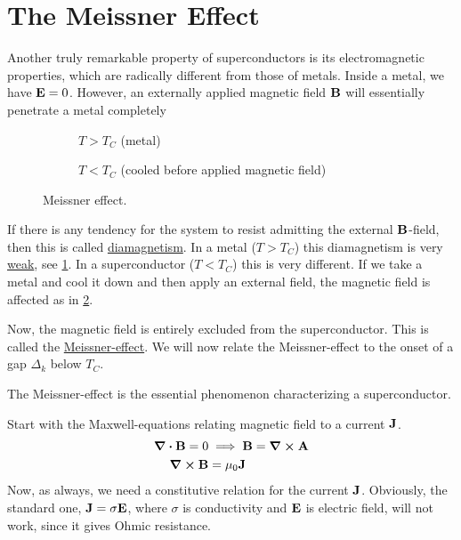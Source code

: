 \section{The Meissner Effect}
Another truly remarkable property of superconductors is its electromagnetic properties, which are radically different from those of metals.
Inside a metal, we have $\vb E = 0$. However, an externally applied magnetic field $\vb B$ will essentially penetrate a metal completely

\begin{figure}
	\centering
	\begin{subfigure}{0.45\textwidth}
		\centering
		
		\caption{$T>T_C$ (metal)}
		\label{fig:meissn_a}
	\end{subfigure}
	\begin{subfigure}{0.45\textwidth}
		\centering
		
		\caption{$T<T_C$ (cooled before applied magnetic field)}
		\label{fig:meissn_b}
	\end{subfigure}	
	\caption{Meissner effect.}
	\label{fig:meissner_1}
\end{figure}
If there is any tendency for the system to resist admitting the external $\vb B$-field, then this is called \underline{diamagnetism}. In a metal ($T>T_C$) this diamagnetism is very \underline{weak}, see \cref{fig:meissn_a}. In a superconductor ($T<T_C$) this is very different. If we take a metal and cool it down and then apply an external field, the magnetic field is affected as in \cref{fig:meissn_b}.


Now, the magnetic field is entirely excluded from the superconductor. This is called the \underline{Meissner-effect}. 
We will now relate the Meissner-effect to the onset of a gap $\Delta_k$ below $T_C$. 
\begin{tcolorbox}
	The Meissner-effect is the essential phenomenon characterizing a superconductor.
\end{tcolorbox}
Start with the Maxwell-equations relating magnetic field to a current $\vb J$.
\begin{align}
	\div{\vb B} = 0 &\implies \vb B =\curl{\vb A} \\
	\curl{\vb B} &= \mu_0\vb J	
\end{align}
Now, as always, we need a constitutive relation for the current $\vb J$. Obviously, the standard one, $\vb J = \sigma \vb E$, where $\sigma$ is conductivity and $\vb E$ is electric field, will not work, since it gives Ohmic resistance.

